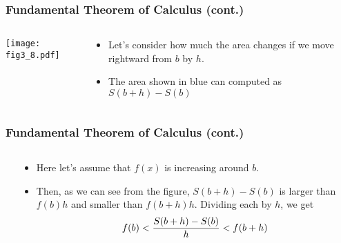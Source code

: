 \documentclass[pdflatex, 12pt]{beamer}
\begin{document}
\begin{frame}
\frametitle{Fundamental Theorem of Calculus (cont.)}
\begin{columns}
\begin{column}{0.5\textwidth}
\texttt{[image: fig3\_8.pdf]}
\end{column}
\begin{column}{0.5\textwidth}
\begin{itemize}
\item Let's consider how much the area changes if we move rightward from $b$ by $h$.
\vspace{0.4cm}
\item The area shown in blue can computed as $S(b + h) - S(b)$
\end{itemize}
\end{column}
\end{columns}
\end{frame}

\begin{frame}
\frametitle{Fundamental Theorem of Calculus (cont.)}
\begin{columns}
\begin{column}{0.5\textwidth}
\end{column}
\begin{column}{0.5\textwidth}
\begin{itemize}
\item Here let's assume that $f(x)$ is increasing around $b$.
\vspace{0.4cm}
\item Then, as we can see from the figure, $S(b + h) - S(b)$ is larger than $f(b)h$ and smaller than $f(b + h)h$. Dividing each by $h$, we get
 {\footnotesize
 \begin{equation}
 f(b) < \frac{S(b + h) - S(b)}{h} < f(b + h) \notag
 \end{equation}
 }
\end{itemize}
\end{column}
\end{columns}
\end{frame}
\end{document}
